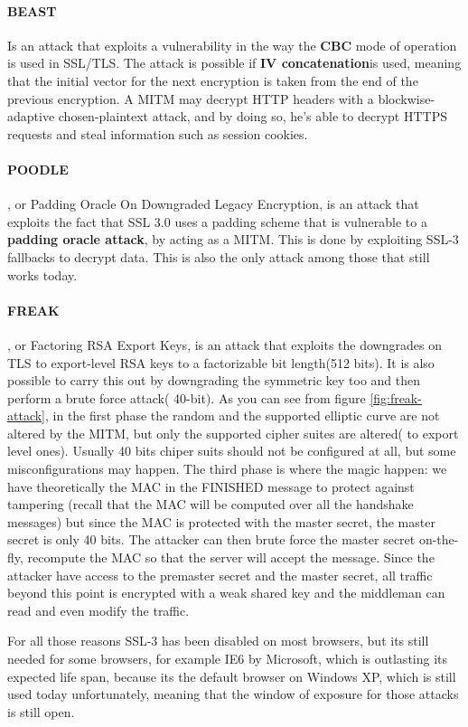 \paragraph{BEAST} Is an attack that exploits a vulnerability in the way
the \textbf{CBC} mode of operation is used in SSL/TLS. The attack is
possible if \textbf{IV concatenation}is used, meaning that the initial
vector for the next encryption is taken from the end of the previous
encryption. A MITM may decrypt HTTP headers with a blockwise-adaptive
chosen-plaintext attack, and by doing so, he's able to decrypt HTTPS
requests and steal information such as session cookies.
\paragraph{POODLE}, or Padding Oracle On Downgraded Legacy Encryption,
is an attack that exploits the fact that SSL 3.0 uses a padding scheme
that is vulnerable to a \textbf{padding oracle attack}, by acting as a
MITM. This is done by exploiting SSL-3 fallbacks to decrypt data. This
is also the only attack among those that still works today.
\paragraph{FREAK}, or Factoring RSA Export Keys, is an attack that
exploits the downgrades on TLS to export-level RSA keys to a
factorizable bit length(512 bits). It is also possible to carry this
out by downgrading the symmetric key too and then perform a brute
force attack( 40-bit). As you can see from figure
\ref{fig:freak-attack}, in the first phase the random and the
supported elliptic curve are not altered by the MITM, but only the
supported cipher suites are altered( to export level ones). Usually 40
bits chiper suits should not be configured at all, but some
misconfigurations may happen. The third phase is where the magic
happen: we have theoretically the MAC  in the FINISHED message to
protect against tampering (recall that the MAC will be computed over
all the handshake messages) but since the MAC is protected with the
master secret, the master secret is only 40 bits. The attacker can
then brute force the master secret on-the-fly, recompute the MAC so
that the server will accept the message. Since the attacker have
access to the premaster secret and the master secret, all traffic
beyond this point is encrypted with a weak shared key and the
middleman can read and even modify the traffic.

For all those reasons SSL-3 has been disabled on most browsers, but
its still needed for some browsers, for example IE6 by Microsoft,
which is outlasting its expected life span, because its the default
browser on Windows XP, which is still used today unfortunately,
meaning that the window of exposure for those attacks is still open.

